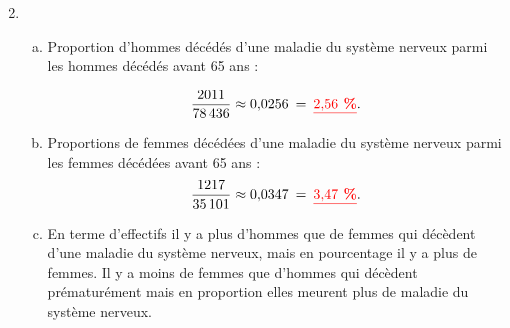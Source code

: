 \documentclass[xcolor={dvipsnames}]{beamer}
\begin{document}
\begin{frame}{}
\begin{enumerate}%
	\setcounter{enumi}{1}
		\item \begin{enumerate}[a)]
			\item Proportion d'hommes décédés  d'une maladie du système nerveux parmi les hommes décédés avant 65 ans :\pause
			
			\begin{equation*}
				\dfrac{\num{2011}}{\num{78436}} \approx \num{0.0256} \: = \: \textcolor{red}{\underline{\textbf{\num{2.56} \%}}}.
			\end{equation*}\pause
			
			\item Proportions de femmes décédées d'une maladie du système nerveux parmi les femmes décédées avant 65 ans :
			\begin{equation*}
				\dfrac{\num{1217}}{\num{35101}} \approx \num{0.0347} 	\: = \:  \textcolor{red}{\underline{\textbf{\num{3.47} \%}}}.
			\end{equation*}\pause
			
			\item En terme d'effectifs il y a plus d'hommes que de femmes qui décèdent d'une maladie du système nerveux, mais en pourcentage il y a plus de femmes. Il y a moins de femmes que d'hommes qui décèdent prématurément mais en proportion elles meurent plus de maladie du système nerveux.
		\end{enumerate}
\end{enumerate}
\end{frame}
\end{document}
